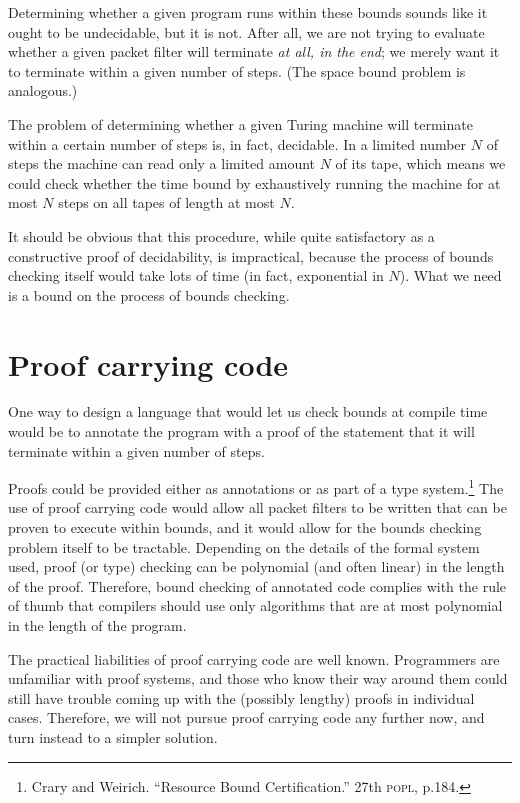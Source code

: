 \documentclass[a4paper,12pt]{scrreprt}
\begin{document}
Determining whether a given program runs within these bounds sounds
like it ought to be undecidable, but it is not. After all, we are not
trying to evaluate whether a given packet filter will terminate
\textit{at all, in the end}; we merely want it to terminate within a
given number of steps. (The space bound problem is analogous.)

The problem of determining whether a given Turing machine will
terminate within a certain number of steps is, in fact, decidable.  In
a limited number $N$ of steps the machine can read only a limited
amount $N$ of its tape, which means we could check whether the time
bound by exhaustively running the machine for at most $N$ steps on all
tapes of length at most $N$.

It should be obvious that this procedure, while quite satisfactory as
a constructive proof of decidability, is impractical, because the
process of bounds checking itself would take lots of time (in fact,
exponential in $N$).  What we need is a bound on the process of bounds
checking.

\section{Proof carrying code}

One way to design a language that would let us check bounds at compile
time would be to annotate the program with a proof of the statement
that it will terminate within a given number of steps.  

Proofs could be provided either as annotations or as part of a type
system.\footnote{Crary and Weirich. ``Resource Bound Certification.''
27th \textsc{popl}, p.184.}  The use of proof carrying code would
allow all packet filters to be written that can be proven to execute
within bounds, and it would allow for the bounds checking problem
itself to be tractable.  Depending on the details of the formal system
used, proof (or type) checking can be polynomial (and often linear) in
the length of the proof.  Therefore, bound checking of annotated code
complies with the rule of thumb that compilers should use only
algorithms that are at most polynomial in the length of the program.

The practical liabilities of proof carrying code are well
known. Programmers are unfamiliar with proof systems, and those who
know their way around them could still have trouble coming up with the
(possibly lengthy) proofs in individual cases. Therefore, we will not
pursue proof carrying code any further now, and turn instead to a
simpler solution.
\end{document}
